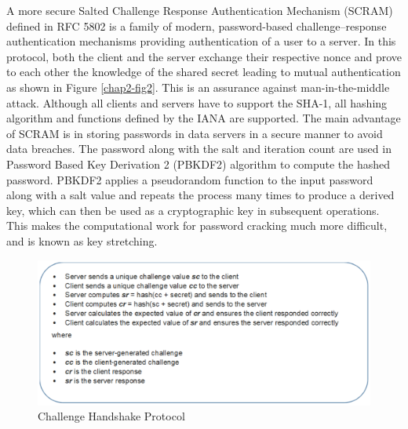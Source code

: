 \begin{multicols}{2}
A more secure Salted Challenge Response Authentication Mechanism (SCRAM) defined in RFC 5802 \cite{chap2-key7} is a family of modern, password-based challenge--response authentication mechanisms providing authentication of a user to a server. In this protocol, both the client and the server exchange their respective nonce and prove to each other the knowledge of the shared secret leading to mutual authentication as shown in Figure \ref{chap2-fig2}. This is an assurance against man-in-the-middle attack. Although all clients and servers have to support the SHA-1, all hashing algorithm and functions defined by the IANA are supported. The main advantage of SCRAM is in storing passwords in data servers in a secure manner to avoid data breaches. The password along with the salt and iteration count are used in Password Based Key Derivation 2 (PBKDF2) algorithm to compute the hashed password. PBKDF2 applies a pseudorandom function to the input password along with a salt value and repeats the process many times to produce a derived key, which can then be used as a cryptographic key in subsequent operations. This makes the computational work for password cracking much more difficult, and is known as key stretching.
\end{multicols}

\begin{figure}[!ht]
\centering
\includegraphics{src/Figures/chap2/1.eps}
\caption{Challenge Handshake Protocol}\label{chap2-fig1}
\end{figure}

